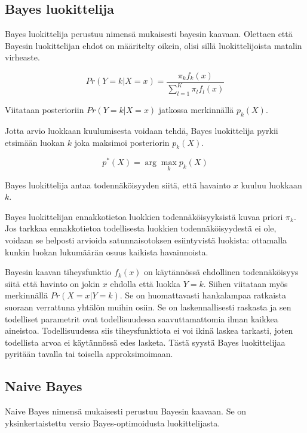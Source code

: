 \documentclass[finnish,twoside,openright]{HYgraduMLDS}
\begin{document}
\subsection{Bayes luokittelija}

Bayes luokittelija perustuu nimensä mukaisesti bayesin kaavaan\cite{james2013ISLR}. Olettaen että Bayesin luokittelijan ehdot on määritelty oikein, olisi sillä luokittelijoista matalin virheaste\cite{james2013ISLR}.

\begin{equation} \label{eq:bayes}
    Pr(Y = k | X = x) = \frac{\pi_k f_k(x)}{\sum^K_{l=1} \pi_l f_l(x)}
\end{equation}

Viitataan posterioriin $Pr(Y = k | X = x)$ jatkossa merkinnällä $p_k(X)$.

Jotta arvio luokkaan kuulumisesta voidaan tehdä, Bayes luokittelija pyrkii etsimään luokan $k$ joka maksimoi posteriorin $p_k(X)$. 

\begin{equation}
    p^*(X) = \arg \max_k p_k(X)
\end{equation}

Bayes luokittelija antaa todennäköisyyden siitä, että havainto $x$ kuuluu luokkaan $k$.

Bayes luokittelijan ennakkotietoa luokkien todennäköisyyksistä kuvaa priori $\pi_k$. Jos tarkkaa ennakkotietoa todellisesta luokkien todennäköisyydestä ei ole, voidaan se helposti arvioida satunnaisotoksen esiintyvistä luokista: ottamalla kunkin luokan lukumäärän osuus kaikista havainnoista. 

Bayesin kaavan tiheysfunktio $f_k(x)$ on käytännössä ehdollinen todennäköisyys siitä että havinto on jokin $x$ ehdolla että luokka $Y = k$. Siihen viitataan myös merkinnällä $Pr(X = x | Y = k)$. Se on huomattavasti hankalampaa ratkaista suoraan verrattuna yhtälön muihin osiin. Se on laskennallisesti raskasta ja sen todelliset parametrit ovat todellisuudessa saavuttamattomia ilman kaikkea aineistoa. Todellisuudessa siis tiheysfunktiota ei voi ikinä laskea tarkasti, joten todellista arvoa ei käytännössä edes lasketa. Tästä syystä Bayes luokittelijaa pyritään tavalla tai toisella approksimoimaan\cite{james2013ISLR}.


\subsection{Naive Bayes}

Naive Bayes nimensä mukaisesti perustuu Bayesin kaavaan. Se on yksinkertaistettu versio Bayes-optimoidusta luokittelijasta\cite{rish2001empirical}.
\end{document}
